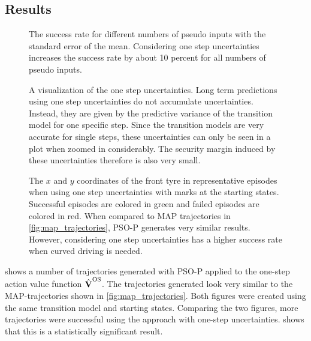 \subsection{Results}
\begin{figure}[tp]
    \centering
    \caption[Results using one step uncertainties]{
        The success rate for different numbers of pseudo inputs with the standard error of the mean.
        Considering one step uncertainties increases the success rate by about 10 percent for all numbers of pseudo inputs.
    }
    \label{fig:os_results}
\end{figure}
\begin{figure}[tp]
    \centering
    \caption[One step uncertainties]{
        A visualization of the one step uncertainties.
        Long term predictions using one step uncertainties do not accumulate uncertainties.
        Instead, they are given by the predictive variance of the transition model for one specific step.
        Since the transition models are very accurate for single steps, these uncertainties can only be seen in a plot when zoomed in considerably.
        The security margin induced by these uncertainties therefore is also very small.
    }
    \label{fig:os_uncertainties}
\end{figure}
\begin{figure}[p]
    \centering
    \caption[Episodes using one step uncertainties]{
        The $x$ and $y$ coordinates of the front tyre in representative episodes when using one step uncertainties with marks at the starting states.
        Successful episodes are colored in green and failed episodes are colored in red.
        When compared to MAP trajectories in \cref{fig:map_trajectories}, PSO-P generates very similar results.
        However, considering one step uncertainties has a higher success rate when curved driving is needed.
    }
    \label{fig:os_trajectories}
\end{figure}
 shows a number of trajectories generated with PSO-P applied to the one-step action value function $\operatorname{\hat{\operatorname{\mathbf{V}}}}^{\text{OS}}$.
The trajectories generated look very similar to the MAP-trajectories shown in \cref{fig:map_trajectories}.
Both figures were created using the same transition model and starting states.
Comparing the two figures, more trajectories were successful using the approach with one-step uncertainties.
 shows that this is a statistically significant result.

